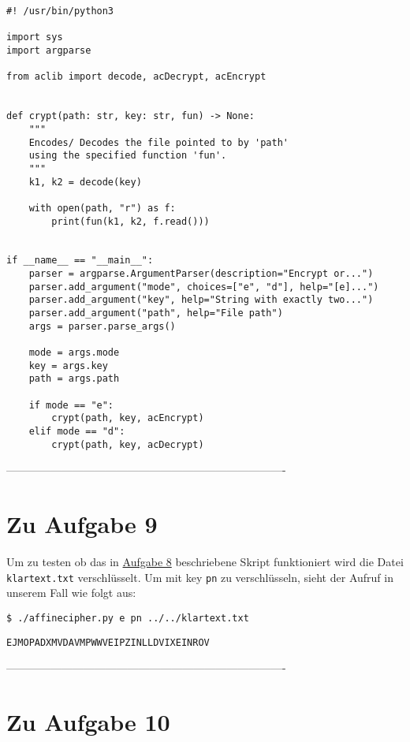 \documentclass[12pt]{article}
\begin{document}
\begin{lstlisting}
#! /usr/bin/python3

import sys 
import argparse

from aclib import decode, acDecrypt, acEncrypt


def crypt(path: str, key: str, fun) -> None:
    """ 
    Encodes/ Decodes the file pointed to by 'path'
    using the specified function 'fun'.
    """
    k1, k2 = decode(key)

    with open(path, "r") as f:
        print(fun(k1, k2, f.read()))


if __name__ == "__main__":
    parser = argparse.ArgumentParser(description="Encrypt or...")
    parser.add_argument("mode", choices=["e", "d"], help="[e]...")
    parser.add_argument("key", help="String with exactly two...")
    parser.add_argument("path", help="File path")
    args = parser.parse_args()

    mode = args.mode
    key = args.key
    path = args.path
    
    if mode == "e":
        crypt(path, key, acEncrypt)
    elif mode == "d":
        crypt(path, key, acDecrypt)

\end{lstlisting}

%
 ----------------------------------------------------------------------------
\section{Zu Aufgabe 9}

Um zu testen ob das in \hyperref[sec:aufgabe_8]{Aufgabe 8} beschriebene Skript funktioniert wird die Datei \texttt{klartext.txt} verschlüsselt. Um mit key \texttt{pn} zu verschlüsseln, sieht der Aufruf in unserem Fall wie folgt aus:

\begin{lstlisting}
$ ./affinecipher.py e pn ../../klartext.txt
\end{lstlisting}

\begin{lstlisting}
EJMOPADXMVDAVMPWWVEIPZINLLDVIXEINROV
\end{lstlisting}

%
 ----------------------------------------------------------------------------
\section{Zu Aufgabe 10}
\end{document}

